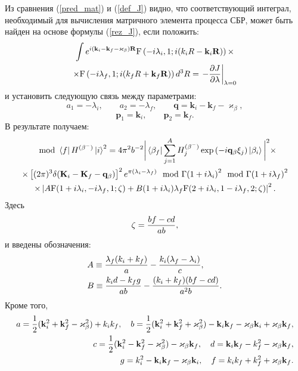 \documentclass[%
master,    %
natbib,      %
subf,        %
href,        %
colorlinks,  %
]{disser}
\let\vec=\mathbf
\begin{document}
Из сравнения (\ref{pred_mat}) и (\ref{def_J}) видно, что соответствующий интеграл,
необходимый для вычисления матричного  элемента процесса СБР, может
быть найден на основе формулы (\ref{rez_J}), если положить:
\begin{multline*}
\int e^{i(\vec k_i - \vec k_f -  \vec \varkappa_\beta)\vec R}
{\rm F} \left(-i \lambda_i,1;i(k_i R - \vec k_i \vec R)\right)\times\\
\times{\rm F} \left(-i \lambda_f,1;i(k_f R + \vec k_f \vec R)\right) d^3 R=
\left.-{{\partial J}\over{\partial \lambda}}\right|_{\lambda=0}
\end{multline*}
и установить следующую связь между параметрами:
$$
a_1=-\lambda_i, \qquad a_2=-\lambda_f, \qquad \vec q= \vec k_i - \vec k_f - \vec \varkappa_\beta,
$$
$$
\vec p_1 =\vec k_i,  \qquad \vec p_2 =\vec k_f.
$$
В результате получаем:
\begin{multline}\label{mat^2}
\mod{\bra{f} H^{(\beta^-)}\ket{i}}^2
=4\pi^2b^{-2}\bigg| \bra{\beta_f } \sum_{j=1}^A H^{(\beta^-)}_{j}\exp{(-i\vec q_\beta\vec\xi_{j})}
\ket{ \beta_i}\bigg|^2
\times\\
\times
\left[(2\pi)^3 \delta (\vec K_i - \vec K_f - \vec q_\beta)\right]^2
e^{{\pi} (\lambda_i - \lambda_f)}{{\mod{\Gamma{(1+i\lambda_i)}}^2
		\mod{\Gamma{(1+i\lambda_f)}}^2}} \\
\times \left| A
{\rm F} (1+i \lambda_i,-i \lambda_f,1;\zeta)
+B
(1+i \lambda_i)\lambda_f {\rm F} (2+i \lambda_i,1-i \lambda_f,2;\zeta)
\right|^2.
\end{multline}
Здесь
\begin{eqnarray}\label{zeta}
\zeta={{b f - c d}\over{ab}},
\end{eqnarray}
и введены обозначения:
\begin{equation}\label{AB}
\begin{split}
&A \equiv {{\lambda_f(k_i+k_f)}\over{a}}-{{k_i(\lambda_f-\lambda_i)}\over{c}},\\
&B \equiv {{k_i d-k_f g}\over{ab}}-{{(k_i+k_f)(b f-c d)}\over{a^2 b}}.
\end{split}
\end{equation}
Кроме того,
\begin{eqnarray}
a={1\over2}(\vec k_i^2+\vec k_f^2-\vec \varkappa_\beta^2)+k_i k_f,
\quad b={1\over2}(\vec k_i^2+\vec k_f^2+\vec \varkappa_\beta^2)-\vec k_i \vec k_f
-\vec \varkappa_\beta\vec k_i+\vec \varkappa_\beta\vec k_f,\nonumber\\
c={1\over2}(\vec k_i^2-\vec k_f^2-\vec \varkappa_\beta^2)- \vec \varkappa_\beta \vec k_f,
\quad d=\vec k_i \vec k_f-k_f^2-\vec \varkappa_\beta\vec k_f,\nonumber\\
g=k_i^2-\vec k_i \vec k_f-\vec \varkappa_\beta\vec k_i,
\quad f= k_i k_f+k_f^2+\vec \varkappa_\beta\vec k_f\nonumber.
\end{eqnarray}
\end{document}
